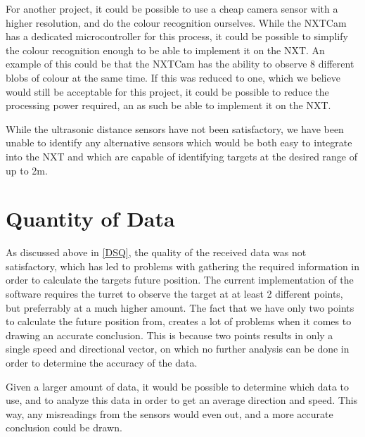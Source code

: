 For another project, it could be possible to use a cheap camera sensor with a
higher resolution, and do the colour recognition ourselves. While the NXTCam has
a dedicated microcontroller for this process, it could be possible to simplify
the colour recognition enough to be able to implement it on the NXT. An example
of this could be that the NXTCam has the ability to observe 8 different blobs of
colour at the same time. If this was reduced to one, which we believe would
still be acceptable for this project, it could be possible to reduce the
processing power required, an as such be able to implement it on the NXT.\nl

While the ultrasonic distance sensors have not been satisfactory, we have been
unable to identify any alternative sensors which would be both easy to integrate
into the NXT and which are capable of identifying targets at the desired range
of up to 2m.

\section{Quantity of Data}
As discussed above in \autoref{DSQ}, the quality of the received data was not
satisfactory, which has led to problems with gathering the required information
in order to calculate the targets future position. The current implementation of
the \name software requires the turret to observe the target at at least 2
different points, but preferrably at a much higher amount.
The fact that we have only two points to calculate the future position from,
creates a lot of problems when it comes to drawing an accurate conclusion. This
is because two points results in only a single speed and directional vector, on
which no further analysis can be done in order to determine the accuracy of the
data.\nl

Given a larger amount of data, it would be possible to determine which data to
use, and to analyze this data in order to get an average direction and speed.
This way, any misreadings from the sensors would even out, and a more accurate
conclusion could be drawn.\nl


